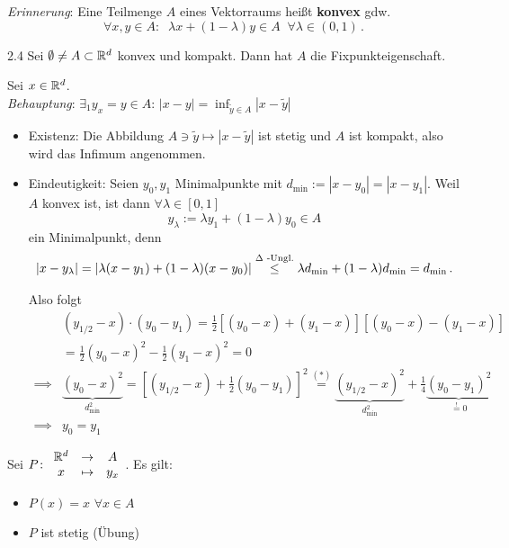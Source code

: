 \documentclass[a4paper]{article}
\begin{document}
\textit{Erinnerung}: Eine Teilmenge $A$ eines Vektorraums heißt \textbf{konvex} gdw. 
\[\forall x,y\in A:\;\; \lambda x+(1-\lambda)y\in A\;\;\forall \lambda\in(0,1)\,.\]

\begin{Kor}{}{2.4}
Sei $\emptyset\ne A\subset \mathbb R^d$ konvex und kompakt. Dann hat $A$ die Fixpunkteigenschaft.
\end{Kor}

\begin{Beweis}
Sei $x\in \mathbb R^d$.\\
\textit{Behauptung}: $\exists_1 y_x=y\in A$: $|x-y|=\inf_{\tilde{y}\in A}|x-\tilde{y}|$
\begin{itemize}
\item Existenz: Die Abbildung $A\ni \tilde{y}\mapsto |x-\tilde{y}|$ ist stetig und $A$ ist kompakt, also wird das Infimum angenommen.
\item Eindeutigkeit: Seien $y_0,y_1$ Minimalpunkte mit $d_{\min}:=|x-y_0|=|x-y_1|$. Weil $A$ konvex ist, ist dann $\forall \lambda\in [0,1]$
\[y_{\lambda}:=\lambda y_1+(1-\lambda)y_0\in A\]
ein Minimalpunkt, denn
\[|x-y_{\lambda}|=|\lambda(x-y_1)+(1-\lambda)(x-y_0)|\overset{\Delta\text{ -Ungl.}}{\le}\lambda d_{\min}+(1-\lambda)d_{\min}=d_{\min}\,.\]
\begin{center}
\end{center}
Also folgt
\begin{align*}
&(y_{1/2}-x)\cdot(y_0-y_1)=\frac{1}{2}[(y_0-x)+(y_1-x)][(y_0-x)-(y_1-x)]\\
&=\frac{1}{2}(y_0-x)^2-\frac{1}{2}(y_1-x)^2=0\tag{$*$}\\
\implies& \underbrace{(y_0-x)^2}_{d_{\min}^2}=[(y_{1/2}-x)+\frac{1}{2}(y_0-y_1)]^2\overset{(*)}{=}\underbrace{(y_{1/2}-x)^2}_{d_{\min}^2}+\frac{1}{4}\underbrace{(y_0-y_1)^2}_{\overset{!}{=}0}\\
\implies& y_0=y_1
\end{align*}
\end{itemize}
Sei $P\colon \begin{array}{clc}
\mathbb R^d &\to& A\\
x&\mapsto& y_x
\end{array}$.
Es gilt:
\begin{itemize}
\item $P(x)=x$ $\forall x\in A$
\item $P$ ist stetig (Übung)
\end{itemize}


\end{Beweis}
\end{document}
